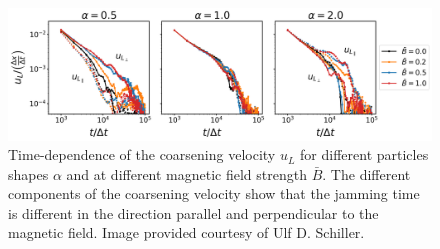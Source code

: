 \begin{figure}
\includegraphics[width=\textwidth]{figures/results/paper1/coarsening_vel.png}
\caption{Time-dependence of the coarsening velocity $u_L$ for different particles shapes $\alpha$  
and at different magnetic field strength $\bar{B}$. The different components of the coarsening velocity 
show that the jamming time is different in the direction parallel and perpendicular to the magnetic field. Image provided
courtesy of Ulf D. Schiller.}
\label{fig:coarsening_velocity}
\end{figure}


